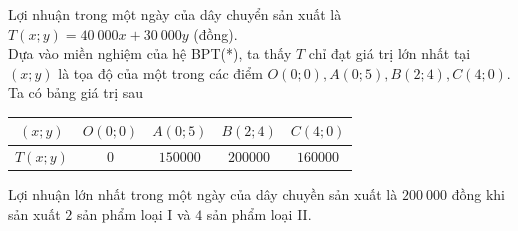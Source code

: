 \begin{ex}
{		Lợi nhuận trong một ngày của dây chuyển sản xuất là $T\left(x;y\right)=40~000x+30~000y$ (đồng).\\
		Dựa vào miền nghiệm của hệ BPT(*), ta thấy $T$ chỉ đạt giá trị lớn nhất tại $\left(x;y\right)$ là tọa độ của một trong các điểm $O\left(0;0\right), A \left(0;5\right), B\left(2;4\right), C\left(4;0\right)$. \\
		Ta có bảng giá trị sau 
		\begin{center}
			\begin{tabular}{|c|c|c|c|c|}
				\hline
				$\left(x;y\right)$ & $O\left(0;0\right)$ & $A\left(0;5\right)$ & $B\left(2;4\right)$ & $C\left(4;0\right)$ \\
				\hline
				$T\left(x;y\right)$ & 0& $150000$ & $200000$ & $160000$ \\
				\hline
			\end{tabular}
		\end{center}
		Lợi nhuận lớn nhất trong một ngày của dây chuyền sản xuất là $200~000$ đồng khi sản xuất $2$ sản phẩm loại I và $4$ sản phẩm loại II.
	} 
\end{ex}

